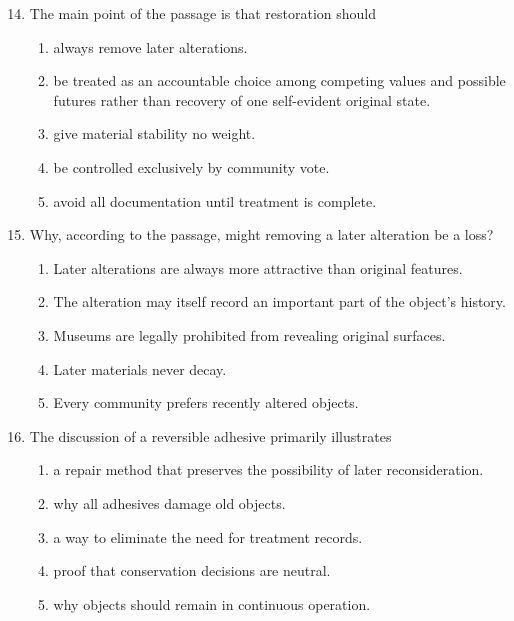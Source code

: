\begin{enumerate}
\setcounter{enumi}{13}
\item The main point of the passage is that restoration should
  \begin{enumerate}
  \item always remove later alterations.
  \item be treated as an accountable choice among competing values and possible
        futures rather than recovery of one self-evident original state.
  \item give material stability no weight.
  \item be controlled exclusively by community vote.
  \item avoid all documentation until treatment is complete.
  \end{enumerate}

\item Why, according to the passage, might removing a later alteration be a loss?
  \begin{enumerate}
  \item Later alterations are always more attractive than original features.
  \item The alteration may itself record an important part of the object's history.
  \item Museums are legally prohibited from revealing original surfaces.
  \item Later materials never decay.
  \item Every community prefers recently altered objects.
  \end{enumerate}

\item The discussion of a reversible adhesive primarily illustrates
  \begin{enumerate}
  \item a repair method that preserves the possibility of later reconsideration.
  \item why all adhesives damage old objects.
  \item a way to eliminate the need for treatment records.
  \item proof that conservation decisions are neutral.
  \item why objects should remain in continuous operation.
  \end{enumerate}


\end{enumerate}
